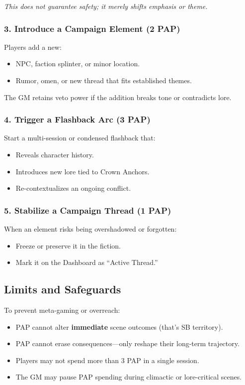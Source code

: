 \documentclass[11pt]{article}
\begin{document}
\textit{This does not guarantee safety; it merely shifts emphasis or theme.}

\subsubsection{3. Introduce a Campaign Element (2 PAP)}
Players add a new:
\begin{itemize}
    \item NPC, faction splinter, or minor location.
    \item Rumor, omen, or new thread that fits established themes.
\end{itemize}

The GM retains veto power if the addition breaks tone or contradicts lore.

\subsubsection{4. Trigger a Flashback Arc (3 PAP)}
Start a multi-session or condensed flashback that:
\begin{itemize}
    \item Reveals character history.
    \item Introduces new lore tied to Crown Anchors.
    \item Re-contextualizes an ongoing conflict.
\end{itemize}

\subsubsection{5. Stabilize a Campaign Thread (1 PAP)}
When an element risks being overshadowed or forgotten:
\begin{itemize}
    \item Freeze or preserve it in the fiction.
    \item Mark it on the Dashboard as ``Active Thread.''
\end{itemize}

\subsection{Limits and Safeguards}

To prevent meta-gaming or overreach:
\begin{itemize}
    \item PAP cannot alter \textbf{immediate} scene outcomes (that's SB territory).
    \item PAP cannot erase consequences---only reshape their long-term trajectory.
    \item Players may not spend more than 3 PAP in a single session.
    \item The GM may pause PAP spending during climactic or lore-critical scenes.
\end{itemize}
\end{document}
